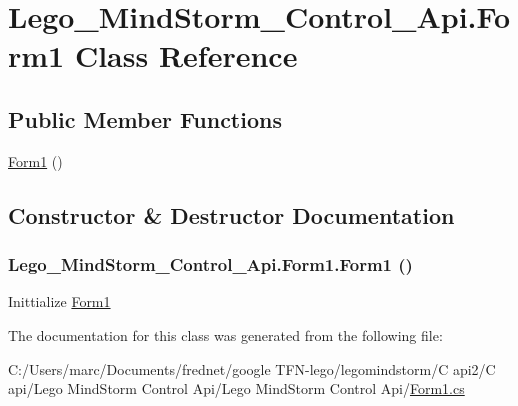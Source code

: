 \hypertarget{class_lego___mind_storm___control___api_1_1_form1}{
\section{Lego\_\-MindStorm\_\-Control\_\-Api.Form1 Class Reference}
\label{class_lego___mind_storm___control___api_1_1_form1}
}
\subsection*{Public Member Functions}
\begin{CompactItemize}
\item 
\hyperlink{class_lego___mind_storm___control___api_1_1_form1_f06af9bbd0f2187d29386916ee814f6e}{Form1} ()
\end{CompactItemize}


\subsection{Constructor \& Destructor Documentation}
\hypertarget{class_lego___mind_storm___control___api_1_1_form1_f06af9bbd0f2187d29386916ee814f6e}{
\subsubsection[{Form1}]{\setlength{\rightskip}{0pt plus 5cm}Lego\_\-MindStorm\_\-Control\_\-Api.Form1.Form1 ()}}
\label{class_lego___mind_storm___control___api_1_1_form1_f06af9bbd0f2187d29386916ee814f6e}


Inittialize \hyperlink{class_lego___mind_storm___control___api_1_1_form1}{Form1} 

The documentation for this class was generated from the following file:\begin{CompactItemize}
\item 
C:/Users/marc/Documents/frednet/google TFN-lego/legomindstorm/C api2/C api/Lego MindStorm Control Api/Lego MindStorm Control Api/\hyperlink{_form1_8cs}{Form1.cs}\end{CompactItemize}
